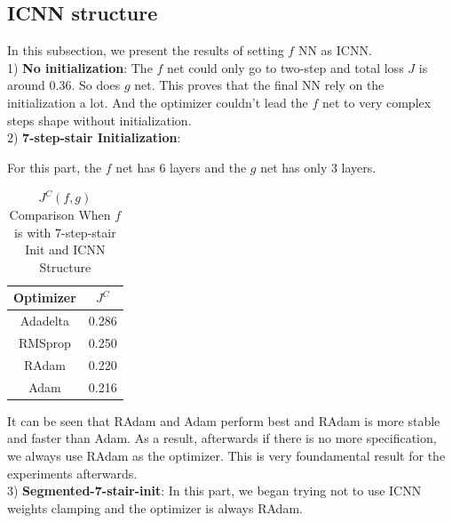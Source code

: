 \documentclass[conference,compsoc]{IEEEtran}
\begin{document}
\subsection{ICNN structure}
In this subsection, we present the results of setting $f$ NN as ICNN. \\
1) \textbf{No initialization}:
The $f$ net could only go to two-step and total loss $J$ is around 0.36. So does $g$ net. This proves that the final NN rely on the initialization a lot. And the optimizer couldn't lead the $f$ net to very complex steps shape without initialization.\\
2) \textbf{7-step-stair Initialization}:

For this part, the $f$ net has 6 layers  and the $g$ net has only 3 layers. 
\begin{table}[htbp]
  \caption{$J^{C}(f,g)$ Comparison When $f$ is with 7-step-stair Init and ICNN Structure }
  \begin{center}
  \begin{tabular}{|c|c|}
  \hline
  \textbf{Optimizer}& $J^{C}$ \\
  \hline

  Adadelta & 0.286\\
  RMSprop& 0.250 \\
  RAdam & 0.220\\
  Adam & 0.216\\
  \hline

\end{tabular}
  \label{tab1e results}
  \end{center}
  \end{table}
  
  It can be seen that RAdam and Adam perform best and RAdam is more stable and faster than Adam. As a result, afterwards if there is no more specification, we always use RAdam as the optimizer. This is very foundamental result for the experiments afterwards.\\
  3) \textbf{Segmented-7-stair-init}:
  In this part, we began trying not to use ICNN weights clamping and the optimizer is always RAdam. \\

  
\end{document}
